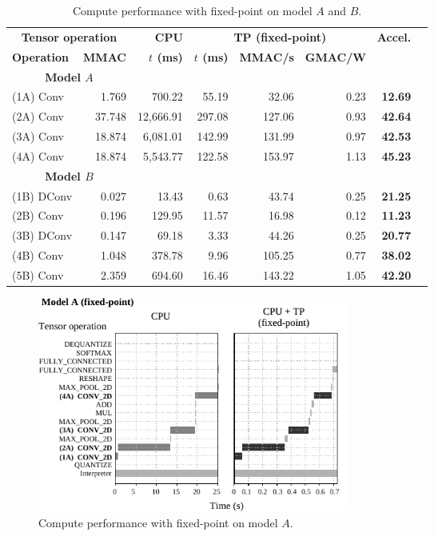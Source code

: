 \begin{table}[!htp]\centering
	\caption{Compute performance with fixed-point on model $A$ and $B$.}\label{tab:performance_fixed_point}
	\scriptsize
\begin{tabular}{lrrrrrrr}\toprule
	\multicolumn{2}{c}{\textbf{Tensor operation}} &\textbf{CPU} &\multicolumn{3}{c}{\textbf{TP (fixed-point)}} &\multirow{2}{*}{\textbf{Accel.}} \\\cmidrule{1-6}
	\textbf{Operation} &\textbf{MMAC} &\textbf{$t$ (ms)} &\textbf{$t$ (ms)} &\textbf{MMAC/s} &\textbf{GMAC/W} & \\\midrule
	\multicolumn{2}{c}{\textbf{Model $A$}} & & & & & \\
	(1A) Conv &1.769 &700.22 &55.19 &32.06 &0.23 &\textbf{12.69} \\
	(2A) Conv &37.748 &12,666.91 &297.08 &127.06 &0.93 &\textbf{42.64} \\
	(3A) Conv &18.874 &6,081.01 &142.99 &131.99 &0.97 &\textbf{42.53} \\
	(4A) Conv &18.874 &5,543.77 &122.58 &153.97 &1.13 &\textbf{45.23} & \\\midrule
	\multicolumn{2}{c}{\textbf{Model $B$}} & & & & & \\
	(1B) DConv &0.027 &13.43 &0.63 &43.74 &0.25 &\textbf{21.25} \\
	(2B) Conv &0.196 &129.95 &11.57 &16.98 &0.12 &\textbf{11.23} \\
	(3B) DConv &0.147 &69.18 &3.33 &44.26 &0.25 &\textbf{20.77} \\
	(4B) Conv &1.048 &378.78 &9.96 &105.25 &0.77 &\textbf{38.02} \\
	(5B) Conv &2.359 &694.60 &16.46 &143.22 &1.05 &\textbf{42.20} \\
	\bottomrule
\end{tabular}
\end{table}

\begin{figure}[t!]
	\centering
	\includegraphics[width=0.5\textwidth]{../figures/sched_A_fixed_point.pdf}
	\caption{Compute performance with fixed-point on model $A$.}
	\label{fig:sched_model_a_fixed}
\end{figure}


